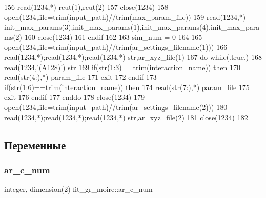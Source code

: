 \begin{DoxyCode}
156         \textcolor{keyword}{read}(1234,*) rcut(1),rcut(2)
157         \textcolor{keyword}{close}(1234)
158         \textcolor{keyword}{open}(1234,file=trim(input\_path)//trim(max\_param\_file))
159         \textcolor{keyword}{read}(1234,*) init\_max\_params(3),init\_max\_params(1),init\_max\_params(4),init\_max\_params(2)
160         \textcolor{keyword}{close}(1234)
161 \textcolor{keywordflow}{    endif}
162 
163     sim\_num = 0
164 
165     \textcolor{keyword}{open}(1234,file=trim(input\_path)//trim(ar\_settings\_filename(1)))
166     \textcolor{keyword}{read}(1234,*);\textcolor{keyword}{read}(1234,*);\textcolor{keyword}{read}(1234,*) str,ar\_xyz\_file(1)
167     \textcolor{keywordflow}{do} \textcolor{keywordflow}{while}(.true.)
168         \textcolor{keyword}{read}(1234,\textcolor{stringliteral}{'(A128)'}) str
169         \textcolor{keywordflow}{if}(str(1:3)==trim(interaction\_name)) \textcolor{keywordflow}{then}
170             \textcolor{keyword}{read}(str(4:),*) param\_file
171             \textcolor{keywordflow}{exit}
172 \textcolor{keywordflow}{        endif}
173         \textcolor{keywordflow}{if}(str(1:6)==trim(interaction\_name)) \textcolor{keywordflow}{then}
174             \textcolor{keyword}{read}(str(7:),*) param\_file
175             \textcolor{keywordflow}{exit}
176 \textcolor{keywordflow}{        endif}
177 \textcolor{keywordflow}{    enddo}
178     \textcolor{keyword}{close}(1234)
179     \textcolor{keyword}{open}(1234,file=trim(input\_path)//trim(ar\_settings\_filename(2)))
180     \textcolor{keyword}{read}(1234,*);\textcolor{keyword}{read}(1234,*);\textcolor{keyword}{read}(1234,*) str,ar\_xyz\_file(2)
181     \textcolor{keyword}{close}(1234)
182 
\end{DoxyCode}


\subsection{Переменные}
\mbox{\label{namespacefit__gr__moire_abc1d82be5a435c0c119ec1d686f6771c}} 
\subsubsection{\texorpdfstring{ar\+\_\+c\+\_\+num}{ar\_c\_num}}
{\footnotesize\ttfamily integer, dimension(2) fit\+\_\+gr\+\_\+moire\+::ar\+\_\+c\+\_\+num}



